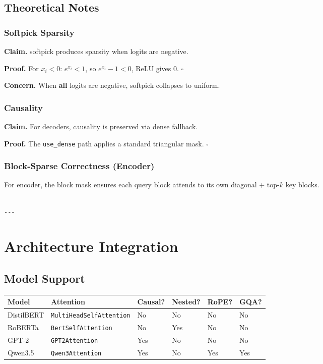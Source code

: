 \subsection{Theoretical Notes}

\subsubsection{Softpick Sparsity}

\textbf{Claim.} softpick produces sparsity when logits are negative.

\textbf{Proof.} For $x_i < 0$: $e^{x_i} < 1$, so $e^{x_i} - 1 < 0$, ReLU gives 0. $\square$

\textbf{Concern.} When \textbf{all} logits are negative, softpick collapses to uniform.

\subsubsection{Causality}

\textbf{Claim.} For decoders, causality is preserved via dense fallback.

\textbf{Proof.} The \texttt{use\_dense} path applies a standard triangular mask. $\square$

\subsubsection{Block-Sparse Correctness (Encoder)}

For encoder, the block mask ensures each query block attends to its own 
diagonal + top-$k$ key blocks.
\begin{lstlisting}

---
\end{lstlisting}

\section{Architecture Integration}

\subsection{Model Support}

\begin{table}[H]
\centering
\small
\begin{tabular}{llllll}
\toprule
\textbf{Model} & \textbf{Attention} & \textbf{Causal?} & \textbf{Nested?} & \textbf{RoPE?} & \textbf{GQA?} \\
\midrule
DistilBERT & \texttt{MultiHeadSelfAttention} & No & No & No & No \\
RoBERTa & \texttt{BertSelfAttention} & No & Yes & No & No \\
GPT-2 & \texttt{GPT2Attention} & Yes & No & No & No \\
Qwen3.5 & \texttt{Qwen3Attention} & Yes & No & Yes & Yes \\
\bottomrule
\end{tabular}
\end{table}

